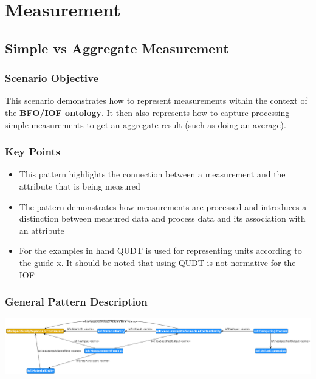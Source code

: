 \chapter{Measurement}

\section{Simple vs Aggregate Measurement}
\subsection*{Scenario Objective}


This scenario demonstrates how to represent measurements within the context of the \textbf{BFO/IOF ontology}. It then also represents how to capture processing simple measurements to get an aggregate result (such as doing an average). 

\subsection*{Key Points}
\begin{itemize}
    \item This pattern highlights the connection between a measurement and the attribute that is being measured
    \item The pattern demonstrates how measurements are processed and introduces a distinction between measured data and process data and its association with an attribute
    \item For the examples in hand QUDT is used for representing units according to the guide x. It should be noted that using QUDT is not normative for the IOF
\end{itemize}

\subsection*{General Pattern Description}
\includegraphics[scale=0.4]{scenarios/measurements/image/measurement_aggregate_general.png}

